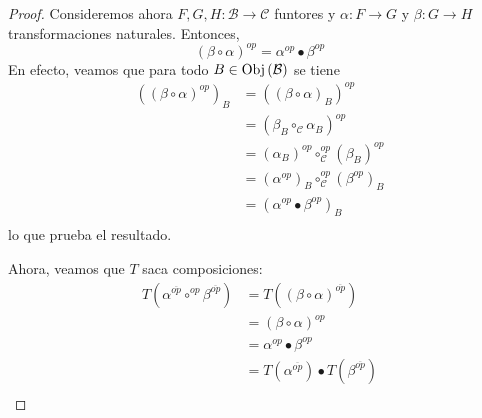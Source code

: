 \documentclass[12pt]{report}
\theoremstyle{largebreak}
\newcommand\cf[3]{\ensuremath{#1:#2\rightarrow#3}}
\newcommand{\Obj}[1]{\ensuremath{\textup{Obj}\left(#1\right)}}
\begin{document}
\begin{proof}
        Consideremos ahora $\cf{F,G,H}{\mathcal{B}}{\mathcal{C}}$ funtores y $\cf{\alpha}{F}{G}$ y $\cf{\beta}{G}{H}$ transformaciones naturales. Entonces,
        \begin{equation*}
            (\beta\circ\alpha)^{op}=\alpha^{op}\bullet\beta^{op}
        \end{equation*}
        En efecto, veamos que para todo $B\in\Obj{\mathcal{B}}$ se tiene
        \begin{equation*}
            \begin{split}
                \left((\beta\circ\alpha)^{op}\right)_B&=((\beta\circ\alpha)_B)^{op}\\
                &=(\beta_B\circ_{\mathcal{C}}\alpha_B)^{op}\\
                &=(\alpha_B)^{op}\circ_{\mathcal{C}}^{op}(\beta_B)^{op}\\
                &=(\alpha^{op})_B\circ_{\mathcal{C}}^{op}(\beta^{op})_B\\
                &=(\alpha^{op}\bullet\beta^{op})_B\\
            \end{split}
        \end{equation*}
        lo que prueba el resultado.

        Ahora, veamos que $T$ saca composiciones:
        \begin{equation*}
            \begin{split}
                T(\alpha^{\overline{op}}\circ^{op}\beta^{\overline{op}})&=T((\beta\circ\alpha)^{\overline{op}})\\
                &=(\beta\circ\alpha)^{op}\\
                &=\alpha^{op}\bullet\beta^{op}\\
                &=T(\alpha^{\overline{op}})\bullet T(\beta^{\overline{op}})\\
            \end{split}
        \end{equation*}


\end{proof}
\end{document}
